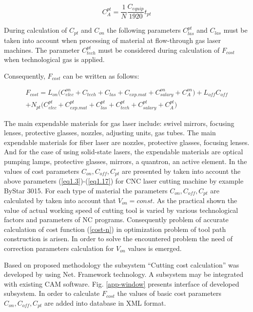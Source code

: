 \documentclass[runningheads]{llncs}
\begin{document}
\begin{equation}
  \label{eq1.17}
  C^{pt}_A = \frac{1}N \frac{C_{equip}}{1920} t_{pt}
\end{equation}

During calculation of $C_{pt}$
and $C_{on}$
the following parameters $C^{pt}_{las}$
and $C_{las}$ must be taken into account
when processing of material at flow-through gas laser machines.
The parameter $C^{pt}_{tech}$
must be considered during calculation of $F_{cost}$
when technological gas is applied.

Consequently,
$F_{cost}$
can be written as follows:

\begin{multline}
  \label{eq1.18}
  F_{cost}
  = L_{on} \Big(
    C^{on}_{elec} + C_{tech} + C_{las} + C_{exp.mat} + C^{on}_{salary} + C^{on}_A
    \Big)
  + L_{off} C_{off} \\
  + N_{pt} \Big(
    C^{pt}_{elec} + C^{pt}_{exp.mat} + C^{pt}_{las} + C^{pt}_{tech} + C^{pt}_{salary} + C^{pt}_A
    \Big)
\end{multline}

The main expendable materials for gas laser include:
swivel mirrors, focusing lenses, protective glasses, nozzles, adjusting units, gas tubes.
The main expendable materials for fiber laser are nozzles, protective glasses, focusing lenses.
And for the case of using solid-state lasers,
the expendable materials are
optical pumping lamps, protective glasses, mirrors, a quantron, an active element.
In \cite{ru14} the values of cost parameters
$C_{on}, C_{off}, C_{pt}$
are presented by taken into account the above parameters
(\ref{eq1.3})-(\ref{eq1.17})
for CNC laser cutting machine by example ByStar 3015.
For each type of material the parameters
$C_{on}, C_{off}, C_{pt}$
are calculated by taken into account that
$V_{on}=const$.
As the practical shown \cite{ru09,Tavaeva2015Nov}
the value of actual working speed of cutting tool
is varied by various technological factors and parameters of NC programs.
Consequently problem of accurate calculation of cost function (\ref{cost-n})
in optimization problem of tool path construction is arisen.
In order to solve the encountered problem
the need of correction parameters calculation for $V_{on}$
values is emerged.

Based on proposed methodology
the subsystem ``Cutting cost calculation''
was developed by using Net. Framework technology.
A subsystem may be integrated with existing CAM software.
Fig. \ref{app-window}
presents interface of developed subsystem.
In order to calculate
$F_{cost}$
the values of basic cost parameters
$C_{on}, C_{off}, C_{pt}$
are added into database in XML format.
\end{document}
